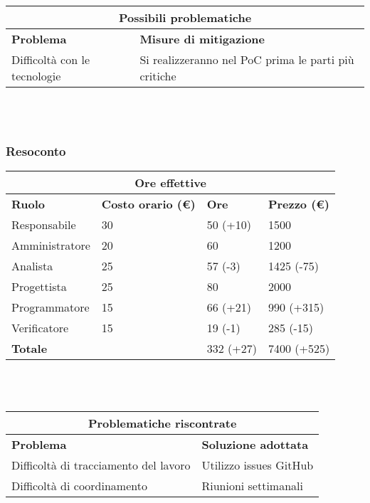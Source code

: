 \documentclass[a4paper, 12pt]{article}
\begin{document}
\begin{center}
    \begin{tabularx}{\textwidth}{|X|X|}
        \hline
        \multicolumn{2}{|c|}{\textbf{Possibili problematiche}}\\
        \hline
        \hline
        \textbf{Problema} & \textbf{Misure di mitigazione}\\
        \hline
        Difficoltà con le tecnologie & Si realizzeranno nel PoC prima le parti più critiche\\
        \hline
    \end{tabularx}\\[8pt]
    \mbox{}\\
\end{center}

\subsubsection{Resoconto}\mbox{}

\begin{center}
    \begin{tabularx}{\textwidth}{|X|X|X|X|}
        \hline
        \multicolumn{4}{|c|}{\textbf{Ore effettive}}\\
        \hline
        \hline
        \textbf{Ruolo} & \textbf{Costo orario (\euro)} & \textbf{Ore} & \textbf{Prezzo (\euro)}\\
        \hline
        Responsabile    & 30 & 50 (+10)  & 1500\\
        \hline
        Amministratore  & 20 & 60  & 1200\\
        \hline
        Analista        & 25 & 57 (-3)  & 1425 (-75)\\
        \hline
        Progettista     & 25 & 80  & 2000\\
        \hline
        Programmatore   & 15 & 66 (+21)  & 990 (+315)\\
        \hline
        Verificatore    & 15 & 19 (-1)  & 285 (-15)\\
        \hline
        \hline
        \textbf{Totale} &    & 332 (+27) & 7400 (+525)\\
        \hline
    \end{tabularx}\\[8pt]
    \mbox{}\\
\end{center}

\begin{center}
    \begin{tabularx}{\textwidth}{|X|X|}
        \hline
        \multicolumn{2}{|c|}{\textbf{Problematiche riscontrate}}\\
        \hline
        \hline
        \textbf{Problema} & \textbf{Soluzione adottata}\\
        \hline
        Difficoltà di tracciamento del lavoro & Utilizzo issues GitHub\\
        \hline
        Difficoltà di coordinamento & Riunioni settimanali\\
        \hline
    \end{tabularx}\\[8pt]
    \mbox{}\\
\end{center}
\end{document}
